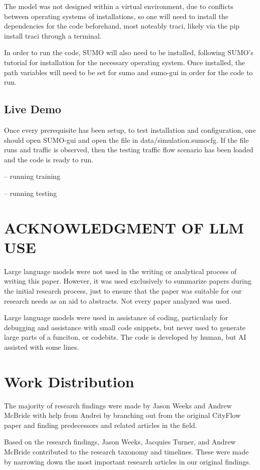 \documentclass[conference]{IEEEtran}
\begin{document}
The model was not designed within a virtual environment, due to conflicts between operating systems of installations, so one will need to install the dependencies for the code beforehand, most noteably traci, likely via the pip install traci through a terminal. 

In order to run the code, SUMO will also need to be installed, following SUMO's tutorial for installation for the necessary operating system. Once installed, the path variables will need to be set for sumo and sumo-gui in order for the code to run.

\subsection{Live Demo}

Once every prerequisite has been setup, to test installation and configuration, one should open SUMO-gui and open the file in data/simulation.sumocfg. If the file runs and traffic is observed, then the testing traffic flow scenario has been loaded and the code is ready to run. 

-- running training

-- running testing

\section{ACKNOWLEDGMENT OF LLM USE}

Large language models were not used in the writing or analytical process of writing this paper. However, it was used exclusively to summarize papers during the initial research process, just to ensure that the paper was suitable for our research needs as an aid to abstracts. Not every paper analyzed was used. 

Large language models were used in assistance of coding, particularly for debugging and assistance with small code snippets, but never used to generate large parts of a funciton, or codebits. The code is developed by human, but AI assisted with some lines. 

\section*{Work Distribution}
The majority of research findings were made by Jason Weeks and Andrew McBride with help from Andrei by branching out from the original CityFlow paper \cite{7} and finding predecessors and related articles in the field. 

Based on the research findings, Jason Weeks, Jacquies Turner, and Andrew McBride contributed to the research taxonomy and timelines. These were made by narrowing down the most important research articles in our original findings.  
\end{document}
